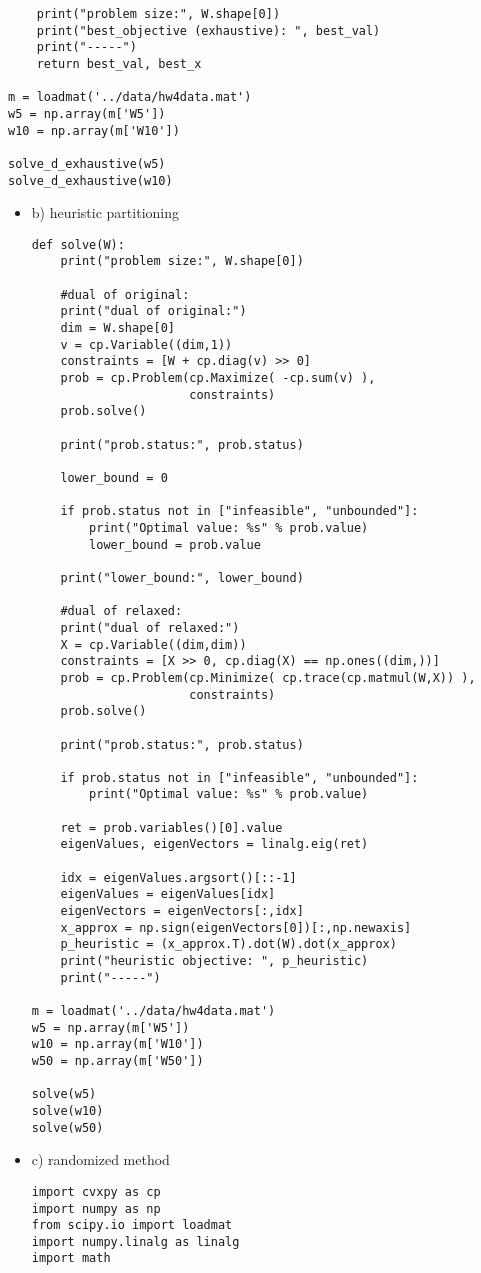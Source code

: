 \documentclass[12pt,letter]{article}
\begin{document}
\begin{enumerate}
\begin{enumerate}
\begin{verbatim}
    print("problem size:", W.shape[0])
    print("best_objective (exhaustive): ", best_val)
    print("-----")
    return best_val, best_x
    
m = loadmat('../data/hw4data.mat')
w5 = np.array(m['W5'])
w10 = np.array(m['W10'])

solve_d_exhaustive(w5)
solve_d_exhaustive(w10)
\end{verbatim}

    
\pagebreak
    \begin{itemize}
    \item b) heuristic partitioning
\begin{verbatim}
def solve(W):
    print("problem size:", W.shape[0])
    
    #dual of original:
    print("dual of original:")
    dim = W.shape[0]
    v = cp.Variable((dim,1))
    constraints = [W + cp.diag(v) >> 0]
    prob = cp.Problem(cp.Maximize( -cp.sum(v) ),
                      constraints)
    prob.solve()

    print("prob.status:", prob.status)
    
    lower_bound = 0
    
    if prob.status not in ["infeasible", "unbounded"]:
        print("Optimal value: %s" % prob.value)
        lower_bound = prob.value

    print("lower_bound:", lower_bound)

    #dual of relaxed:
    print("dual of relaxed:")
    X = cp.Variable((dim,dim))
    constraints = [X >> 0, cp.diag(X) == np.ones((dim,))]
    prob = cp.Problem(cp.Minimize( cp.trace(cp.matmul(W,X)) ),
                      constraints)
    prob.solve()

    print("prob.status:", prob.status)
    
    if prob.status not in ["infeasible", "unbounded"]:
        print("Optimal value: %s" % prob.value)

    ret = prob.variables()[0].value
    eigenValues, eigenVectors = linalg.eig(ret)

    idx = eigenValues.argsort()[::-1]
    eigenValues = eigenValues[idx]
    eigenVectors = eigenVectors[:,idx]
    x_approx = np.sign(eigenVectors[0])[:,np.newaxis]
    p_heuristic = (x_approx.T).dot(W).dot(x_approx)
    print("heuristic objective: ", p_heuristic)
    print("-----")
    
m = loadmat('../data/hw4data.mat')
w5 = np.array(m['W5'])
w10 = np.array(m['W10'])
w50 = np.array(m['W50'])

solve(w5)
solve(w10)
solve(w50)
\end{verbatim}
      \pagebreak
    \item c) randomized method
\begin{verbatim}
import cvxpy as cp
import numpy as np
from scipy.io import loadmat
import numpy.linalg as linalg
import math


\end{verbatim}
\end{itemize}
\end{enumerate}
\end{enumerate}
\end{document}
